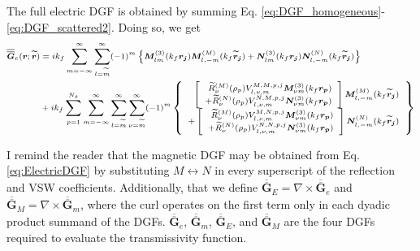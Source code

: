 The full electric DGF is obtained by summing Eq. \ref{eq:DGF_homogeneous}-\ref{eq:DGF_scattered2}. Doing so, we get
%
\begin{equation}\label{eq:ElectricDGF} \scriptsize
\begin{split}
\overline{\overline{\boldsymbol{G}}}_{e}(\boldsymbol{r}; \boldsymbol{\widetilde{r}})
&= ik_{f} \sum\limits_{m=-\infty}^{\infty} \sum\limits_{l=\widetilde{m}}^{\infty} (-1)^{m}
\left\{
\boldsymbol{M}_{l m}^{(3)}(k_{f} \boldsymbol{r_{j}}) \boldsymbol{M}_{l, -m}^{(M)}(k_{f} \boldsymbol{\widetilde{r}_{j}})
+ \boldsymbol{N}_{l m}^{(3)}(k_{f} \boldsymbol{r_{j}}) \boldsymbol{N}_{l, -m}^{(N)}(k_{f} \boldsymbol{\widetilde{r}_{j}})
\right\}
\\
& + ik_{f} \sum\limits_{p=1}^{N_{s}} \sum\limits_{m=-\infty}^{\infty} \sum\limits_{l=\widetilde{m}}^{\infty} \sum_{\nu = \widetilde{m}}^{\infty} (-1)^{m}
\left\{ \begin{array}{r} \left[ \begin{array}{r}
\widetilde{R}_{\nu}^{(M)}(\rho_{p}) V_{l, \nu,m}^{M,M,p,j} \boldsymbol{M}_{\nu m}^{(3)}(k_{f} \boldsymbol{r_{p}})
\\
+ \widetilde{R}_{\nu}^{(N)}(\rho_{p}) V_{l, \nu,m}^{N,M,p,j} \boldsymbol{N}_{\nu m}^{(3)}(k_{f} \boldsymbol{r_{p}})
\end{array} \right] \boldsymbol{M}_{l, -m}^{(M)}(k_{f} \boldsymbol{\widetilde{r}_{j}})
\\
+ \left[ \begin{array}{r}
\widetilde{R}_{\nu}^{(M)}(\rho_{p}) V_{l, \nu,m}^{M,N,p,j} \boldsymbol{M}_{\nu m}^{(3)}(k_{f} \boldsymbol{r_{p}})
\\
+ \widetilde{R}_{\nu}^{(N)}(\rho_{p}) V_{l, \nu,m}^{N,N,p,j} \boldsymbol{N}_{\nu m}^{(3)}(k_{f} \boldsymbol{r_{p}})
\end{array} \right] \boldsymbol{N}_{l, -m}^{(N)}(k_{f} \boldsymbol{\widetilde{r}_{j}})
\end{array} \right\}
\end{split}
\end{equation}

I remind the reader that the magnetic DGF may be obtained from Eq. \ref{eq:ElectricDGF} by substituting $M \leftrightarrow N$ in every superscript of the reflection and VSW coefficients. Additionally, that we define $\overline{\overline{\boldsymbol{G}}}_{E} = \nabla \times \overline{\overline{\boldsymbol{G}}}_{e}$ and $\overline{\overline{\boldsymbol{G}}}_{M} = \nabla \times \overline{\overline{\boldsymbol{G}}}_{m}$, where the curl operates on the first term only in each dyadic product summand of the DGFs. $\overline{\overline{\boldsymbol{G}}}_{e}$, $\overline{\overline{\boldsymbol{G}}}_{m}$, $\overline{\overline{\boldsymbol{G}}}_{E}$, and $\overline{\overline{\boldsymbol{G}}}_{M}$ are the four DGFs required to evaluate the transmissivity function.


